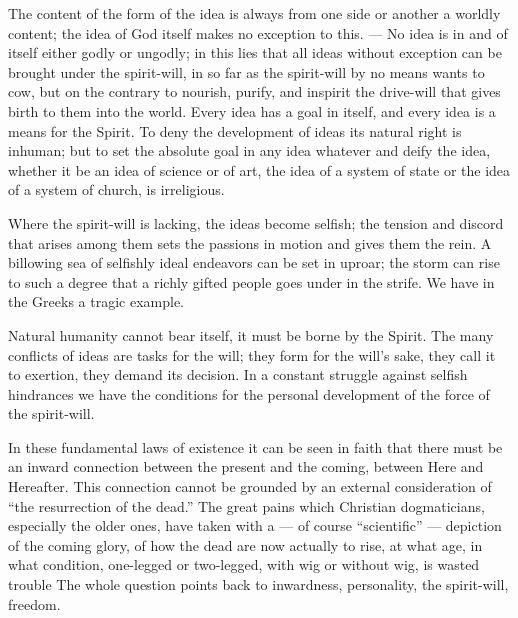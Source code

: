 \documentclass[12pt,a4paper,openany]{book}
\newcommand{\opage}[1]{\marginnote{\footnotesize\textit{[#1]}}}
\begin{document}
The content of the form of the idea is always from one side or another
a worldly content; the idea of God itself makes no
exception to this. --- No idea is in and of itself either godly
or ungodly; in this lies that all ideas without exception
can be brought under the spirit-will, in so far as the spirit-will
by no means wants to cow, but on the contrary to nourish, purify, and inspirit
the drive-will that gives birth to them into the world. Every idea
has a goal in itself, and every idea is a means for
the Spirit. To deny the development of ideas its natural right
is inhuman; but to set the absolute goal in any
idea whatever and deify the idea, whether it be
an idea of science or of art, the idea of a system of state
or the idea of a system of church, is irreligious.

Where the spirit-will is lacking, the ideas become selfish;
the tension and discord that arises among them sets
the passions in motion and gives them the rein. A billowing
sea of selfishly ideal endeavors can be set in uproar;
\setcounter{footnote}{0}%
\opage{82}the storm can rise to such a degree that a richly gifted
people goes under in the strife. We have in the Greeks a
tragic example.

Natural humanity cannot bear itself,
it must be borne by the Spirit. The many conflicts of ideas are
tasks for the will; they form for the will's sake, they
call it to exertion, they demand its decision.
In a constant struggle against selfish hindrances we have
the conditions for the personal development of the force of the
spirit-will.

In these fundamental laws of existence it can be seen in faith
that there must be an inward connection
between the present and the coming, between
Here and Hereafter. This connection cannot be grounded
by an external consideration of ``the resurrection of the dead.''
The great pains which Christian dogmaticians, especially the
older ones, have taken with a --- of course ``scientific'' ---
depiction of the coming glory, of how the
dead are now actually to rise, at what age, in what
condition, one-legged or two-legged, with wig or without
wig, is wasted trouble %
The whole question points
back to inwardness, personality, the spirit-will,
freedom.
\end{document}
